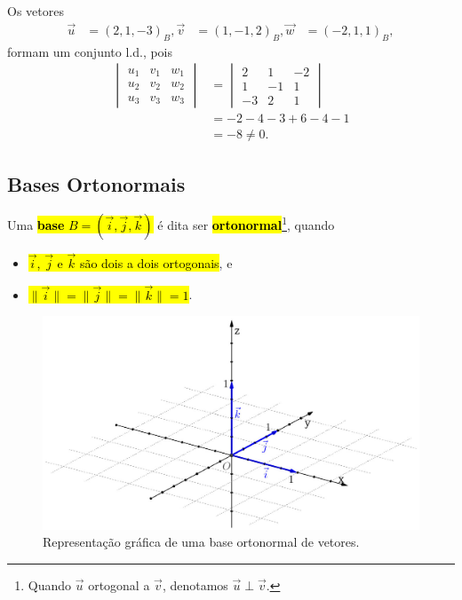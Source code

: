 \begin{ex}
  Os vetores 
  \begin{align}
    \vec{u} &= (2,1,-3)_B,
    \vec{v} &= (1,-1,2)_B,
    \vec{w} &= (-2,1,1)_B,
  \end{align}
  formam um conjunto l.d., pois
  \begin{align}
    \begin{vmatrix}
      u_1 & v_1 & w_1\\
      u_2 & v_2 & w_2\\
      u_3 & v_3 & w_3
    \end{vmatrix} &=
    \begin{vmatrix}
      2 & 1 & -2\\
      1 & -1 & 1\\
      -3 & 2 & 1
    \end{vmatrix} \\
    &= -2-4-3+6-4-1 \\
    &= -8\neq 0.
  \end{align}
\end{ex}


\subsection{Bases Ortonormais}

Uma \hl{\textbf{base} $B = (\vec{i}, \vec{j}, \vec{k})$} é dita ser \hl{\textbf{ortonormal}}\footnote{Quando $\vec{u}$ ortogonal a $\vec{v}$, denotamos $\vec{u}\perp\vec{v}$.}, quando
\begin{itemize}
\item \hl{$\vec{i}$, $\vec{j}$ e $\vec{k}$ são dois a dois ortogonais}, e
\item \hl{$\|\vec{i}\|=\|\vec{j}\|=\|\vec{k}\|=1$}.
\end{itemize}

\begin{figure}[h]
  \centering
  \includegraphics[width=5in]{./cap_base/dados/fig_base_ortonormal/fig.jpg}
  \caption{Representação gráfica de uma base ortonormal de vetores.}
  \label{cap_base_sec_base:fig:base_ortonormal}
\end{figure}

